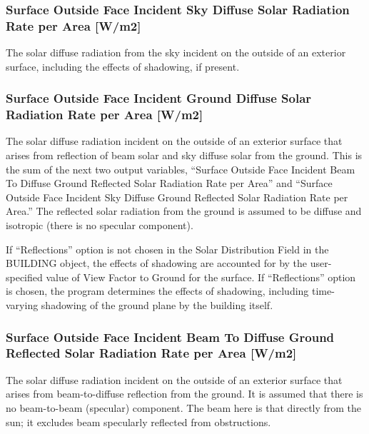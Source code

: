 \subsubsection{Surface Outside Face Incident Sky Diffuse Solar Radiation Rate per Area {[}W/m2{]}}\label{surface-outside-face-incident-sky-diffuse-solar-radiation-rate-per-area-wm2}

The solar diffuse radiation from the sky incident on the outside of an exterior surface, including the effects of shadowing, if present.

\subsubsection{Surface Outside Face Incident Ground Diffuse Solar Radiation Rate per Area {[}W/m2{]}}\label{surface-outside-face-incident-ground-diffuse-solar-radiation-rate-per-area-wm2}

The solar diffuse radiation incident on the outside of an exterior surface that arises from reflection of beam solar and sky diffuse solar from the ground. This is the sum of the next two output variables, ``Surface Outside Face Incident Beam To Diffuse Ground Reflected Solar Radiation Rate per Area'' and ``Surface Outside Face Incident Sky Diffuse Ground Reflected Solar Radiation Rate per Area.'' The reflected solar radiation from the ground is assumed to be diffuse and isotropic (there is no specular component).

If ``Reflections'' option is not chosen in the Solar Distribution Field in the BUILDING object, the effects of shadowing are accounted for by the user-specified value of View Factor to Ground for the surface. If ``Reflections'' option is chosen, the program determines the effects of shadowing, including time-varying shadowing of the ground plane by the building itself.

\subsubsection{Surface Outside Face Incident Beam To Diffuse Ground Reflected Solar Radiation Rate per Area {[}W/m2{]}}\label{surface-outside-face-incident-beam-to-diffuse-ground-reflected-solar-radiation-rate-per-area-wm2}

The solar diffuse radiation incident on the outside of an exterior surface that arises from beam-to-diffuse reflection from the ground. It is assumed that there is no beam-to-beam (specular) component. The beam here is that directly from the sun; it excludes beam specularly reflected from obstructions.


